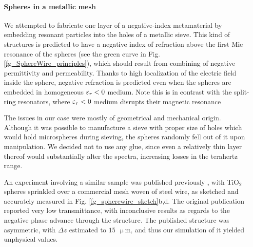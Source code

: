 \paragraph{Spheres in a metallic mesh} %
We attempted to fabricate one layer of a negative-index metamaterial by embedding resonant particles into the holes of a metallic sieve. This kind of structures is predicted to have a negative index of refraction above the first Mie resonance of the spheres (see the green curve in Fig. \ref{fg_SphereWire_principles}), which should result from combining of negative permittivity and permeability. Thanks to high localization of the electric field inside the sphere, negative refraction is predicted even when the spheres are embedded in homogeneous $\varepsilon_r <0$ medium. Note this is in contrast with the split-ring resonators, where $\varepsilon_r <0$ medium disrupts their magnetic resonance \cite{jelinek2009artificial}

The issues in our case were mostly of geometrical and mechanical origin. Although it was possible to manufacture a sieve with proper size of holes which would hold microspheres during sieving, the spheres randomly fell out of it upon manipulation. We decided not to use any glue, since even a relatively thin layer thereof would substantially alter the spectra, increasing losses in the terahertz range.

An experiment involving a similar sample was published previously \cite{yakiyama2012terahertz}, with TiO$_{2}$ spheres sprinkled over a commercial mesh woven of steel wire, as sketched and accurately measured in Fig. \ref{fg_spherewire_sketch}b,d. The original publication reported very low transmittance, with inconclusive results as regards to the negative phase advance through the structure. The published structure was asymmetric, with $\Delta z$ estimated to $15$ $\upmu$m, and thus our simulation of it yielded unphysical values.

%    



